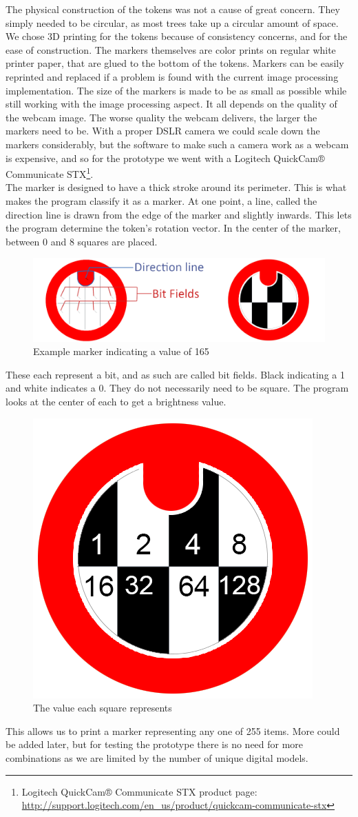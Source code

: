 The physical construction of the tokens was not a cause of great concern. They simply needed to be circular, as most trees take up a circular amount of space. We chose 3D printing for the tokens because of consistency concerns, and for the ease of construction. The markers themselves are color prints on regular white printer paper, that are glued to the bottom of the tokens. Markers can be easily reprinted and replaced if a problem is found with the current image processing implementation. 
The size of the markers is made to be as small as possible while still working with the image processing aspect. It all depends on the quality of the webcam image. The worse quality the webcam delivers, the larger the markers need to be. With a proper DSLR camera we could scale down the markers considerably, but the software to make such a camera work as a webcam is expensive, and so for the prototype we went with a Logitech QuickCam® Communicate STX\footnote{Logitech QuickCam® Communicate STX product page: \url{http://support.logitech.com/en_us/product/quickcam-communicate-stx}}.\\

The marker is designed to have a thick stroke around its perimeter. This is what makes the program classify it as a marker. At one point, a line, called the direction line is drawn from the edge of the marker and slightly inwards. This lets the program determine the token's rotation vector. In the center of the marker, between 0 and 8 squares are placed.
\begin{figure}[H]
	\centering
	\includegraphics[width=1\linewidth]{figure/Design/markermap.png}
	\caption{Example marker indicating a value of 165}
	\label{fig:circle2}
\end{figure}
These each represent a bit, and as such are called bit fields. Black indicating a 1 and white indicates a 0. They do not necessarily need to be square. The program looks at the center of each to get a brightness value.
\begin{figure}[H]
	\centering
	\includegraphics[width=0.25\linewidth]{figure/Design/markerValues.png}
	\caption{The value
		 each square represents}
	\label{fig:circle}
\end{figure}
This allows us to print a marker representing any one of 255 items. More could be added later, but for testing the prototype there is no need for more combinations as we are limited by the number of unique digital models.

